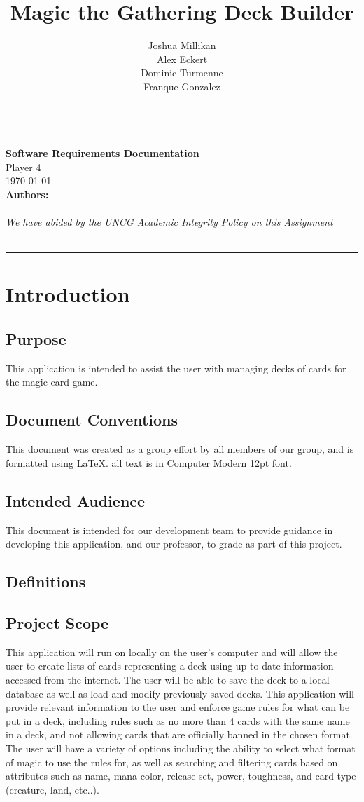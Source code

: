 \documentclass[12pt]{report}
\author{Joshua Millikan \\ Alex Eckert\\ Dominic Turmenne \\ Franque Gonzalez}
\title{Magic the Gathering Deck Builder}
\begin{document}
	\makeatletter
	\begin{titlepage}
		\centering
		\huge{\textbf{\@title}}
		\large{\\ \textbf{Software Requirements Documentation}}\\
		\vspace{1.5cm}
		Player 4\\
		\today\\
		\vspace{1.5cm}
		\textbf{Authors:}\\\@author\\
		\vspace{\fill}
		\small{\textit{We have abided by the UNCG Academic Integrity Policy on this Assignment}}\\
		\hfill\\
		\rule{16cm}{5pt}\vskip1cm
		
	\end{titlepage}
\tableofcontents
\chapter{Introduction}
\section{Purpose}
This application is intended to assist the \gls{user} with managing decks of cards for the \gls{magic} card game.
\section{Document Conventions}
This document was created as a group effort by all members of our group, and is formatted using \LaTeX. all text is in Computer Modern 12pt font.
\section{Intended Audience}
This document is intended for our development team to provide guidance in developing this application, and our professor, to grade as part of this project.
\clearpage
\section{Definitions}
\printnoidxglossaries   
\section{Project Scope}
This application will run on locally on the \gls{user}'s computer and will allow the user to create lists of cards representing a deck using up to date information accessed from the internet. The user will be able to save the deck to a local database as well as load and modify previously saved decks. This application will provide relevant information to the user and enforce game rules for what can be put in a deck, including rules such as no more than 4 cards with the same name in a deck, and not allowing cards that are officially banned in the chosen format. The user will have a variety of options including the ability to select what format of \gls{magic} to use the rules for, as well as searching and filtering cards based on attributes such as name, mana color, release set, power, toughness, and card type (creature, land, etc..).
\end{document}
